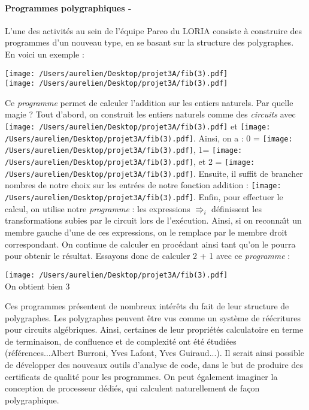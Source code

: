 \documentclass[a4paper,11pt,titlepage]{article}
\newcommand\insExemplePDF[1]{\texttt{[image: /Users/aurelien/Desktop/projet3A/fib(3).pdf]}}
\begin{document}
\paragraph{Programmes polygraphiques -}
L'une des activit\'{e}s au sein de l'\'{e}quipe Pareo du LORIA consiste \`{a} construire des programmes d'un nouveau type, en se basant sur la structure des polygraphes. En voici un exemple :
\begin{center} 
\insExemplePDF{7}\\\insExemplePDF{8}\end{center}
Ce \textit{programme} permet de calculer l'addition sur les entiers naturels. Par quelle magie ? Tout d'abord, on construit les entiers naturels comme des \textit{circuits} avec \insExemplePDF{1} et \insExemplePDF{2}. Ainsi, on a : 0 = \insExemplePDF{1}, 1= \insExemplePDF{3}, et 2 = \insExemplePDF{4}. Ensuite, il suffit de brancher nombres de notre choix sur les entr\'{e}es de notre fonction addition : \insExemplePDF{5}. Enfin, pour effectuer le calcul, on utilise notre \textit{programme} : les expressions $\Rrightarrow_{i}$ d\'{e}finissent les transformations subies par le circuit lors de l'ex\'{e}cution. Ainsi, si on reconna\^{\i}t un membre gauche d'une de ces expressions, on le remplace par le membre droit correspondant. On continue de calculer en proc\'{e}dant ainsi tant qu'on le pourra pour obtenir le r\'{e}sultat. Essayons donc de calculer 2 + 1 avec ce \textit{programme} : \\
\begin{center}\insExemplePDF{15}\\On obtient bien 3\end{center}
Ces programmes pr\'{e}sentent de nombreux int\'{e}r\^{e}ts du fait de leur structure de polygraphes. Les polygraphes peuvent \^{e}tre vus comme un syst\`{e}me de r\'{e}\'{e}critures pour circuits alg\'{e}briques. Ainsi, certaines de leur propri\'{e}t\'{e}s calculatoire en terme de terminaison, de confluence et de complexit\'{e} ont \'{e}t\'{e} \'{e}tudi\'{e}es (r\'{e}f\'{e}rences...Albert Burroni, Yves Lafont, Yves Guiraud...). Il serait ainsi possible de d\'{e}velopper des nouveaux outils d'analyse de code, dans le but de produire des certificats de qualit\'{e} pour les programmes. On peut \'{e}galement imaginer la conception de processeur d\'{e}di\'{e}s, qui calculent naturellement de fa\c{c}on polygraphique.
\end{document}
